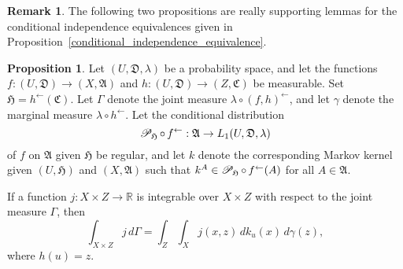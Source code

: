 \documentclass[
twoside=true,
paper=letter,
fontsize=9pt,
pagesize=auto,
leqno,
openany,
headsepline,
overfullrule,
]{scrbook}
\theoremstyle{plain}
\theoremstyle{plain}
\theoremstyle{definition}
\newtheorem{rmk}[thm]{Remark}
\theoremstyle{bfnoteitalic}
\newtheorem{propboldnote}[thm]{Proposition}
\theoremstyle{bfnoteroman}
\newcommand{\sigalg}[1]{\mathfrak{#1}}
\newcommand{\cali}[1]{\mathscr{#1}}
\newcommand{\condprobop}[1]{\mathop{\cali{P}\hspace{-1pt}}\nolimits_{#1}}
\newcommand{\preimage}[1]{#1^{\leftarrow}}
\newcommand{\R}{\mathbb{R}}
\newcommand{\sigmaalgebra}{\sigalg{A}}
\newcommand{\sigmaalgebraiii}{\sigalg{C}}
\newcommand{\funch}{h}
\newcommand{\funcj}{j}
\newcommand{\funck}{k}
\newcommand{\function}{f}
\newcommand{\functioniii}{h}
\newcommand{\measurespace}{X}
\newcommand{\measurespaceiii}{Z}
\newcommand{\mspaceelt}{x}
\newcommand{\mspaceeltiii}{z}
\newcommand{\measureiii}{\lambda}
\newcommand{\measlambda}{\lambda}
\newcommand{\seti}{A}
\newcommand{\uspace}{U}%
\newcommand{\uspaceelt}{u}
\newcommand{\uspacesig}{\sigalg{D}}
\newcommand{\measonprod}{\Gamma}%
\newcommand{\marginalthree}{\gamma}
\begin{document}
\begin{rmk}
The following two propositions are really supporting lemmas for the conditional independence equivalences given in Proposition~\ref{conditional_independence_equivalence}.
\end{rmk}



\begin{propboldnote}\label{joint_decomposition}
Let 
$(\uspace, \uspacesig, \measureiii)$ 
be a probability space, and let the functions
$\function:(\uspace,\uspacesig)\to (\measurespace,\sigmaalgebra)$ 
and
$\functioniii:(\uspace,\uspacesig)\to (\measurespaceiii,\sigmaalgebraiii)$
be measurable. Set
$\sigalg{H} = \preimage{\functioniii}(\sigmaalgebraiii)$. 
Let $\measonprod$ denote the joint measure  $\measureiii\circ\preimage{(\function,\functioniii)}$,
and let $\marginalthree$ denote the marginal measure $\measlambda\circ\preimage{\funch}$.
Let the conditional distribution
\[
\condprobop{\sigalg{H}}\circ\, \preimage{\function}:
\sigmaalgebra \to L_1(\uspace,\uspacesig,\measureiii)
\]
of $\function$ on $\sigmaalgebra$ given $\sigalg{H}$ 
be regular, and let
$\funck$
denote the corresponding Markov kernel given
$(\uspace,\sigalg{H})$ and $(\measurespace,\sigmaalgebra)$ such that
$\funck^\seti\in
\condprobop{\sigalg{H}}\circ\, \preimage{\function}(\seti)$
for all $\seti\in\sigmaalgebra$.

If a function
$j:\measurespace\times\measurespaceiii \to \R$
is integrable over
$\measurespace\times\measurespaceiii$
with respect to the joint measure $\measonprod$,
then 
\[
\int_{\measurespace\times\measurespaceiii} \funcj \,
d \measonprod
=
\int_\measurespaceiii\int_\measurespace
\funcj(\mspaceelt,\mspaceeltiii) \,
d \funck_\uspaceelt(\mspaceelt)\,
d \marginalthree(\mspaceeltiii),
\]
where  $\funch(\uspaceelt) = \mspaceeltiii$.
\end{propboldnote}
\end{document}
